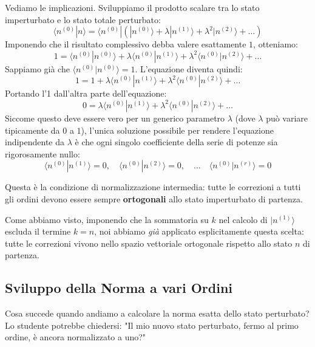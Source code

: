 Vediamo le implicazioni. Sviluppiamo il prodotto scalare tra lo stato imperturbato e lo stato totale perturbato:
\begin{equation}
\langle n^{(0)} | n \rangle = \langle n^{(0)} | \left( |n^{(0)}\rangle + \lambda |n^{(1)}\rangle + \lambda^2 |n^{(2)}\rangle + \dots \right)
\end{equation}
Imponendo che il risultato complessivo debba valere esattamente $1$, otteniamo:
\begin{equation}
1 = \langle n^{(0)} | n^{(0)} \rangle + \lambda \langle n^{(0)} | n^{(1)} \rangle + \lambda^2 \langle n^{(0)} | n^{(2)}\rangle + \dots
\end{equation}
Sappiamo già che $\langle n^{(0)} \vert{} n^{(0)} \rangle = 1$. L'equazione diventa quindi:
\begin{equation}
1 = 1 + \lambda \langle n^{(0)} | n^{(1)} \rangle + \lambda^2 \langle n^{(0)} | n^{(2)}\rangle + \dots
\end{equation}
Portando l'1 dall'altra parte dell'equazione:
\begin{equation}
0 = \lambda \langle n^{(0)} | n^{(1)} \rangle + \lambda^2 \langle n^{(0)} | n^{(2)}\rangle + \dots
\end{equation}
Siccome questo deve essere vero per un generico parametro $\lambda$ (dove $\lambda$ può variare tipicamente da $0$ a $1$), l'unica soluzione possibile per rendere l'equazione indipendente da $\lambda$ è che ogni singolo coefficiente della serie di potenze sia rigorosamente nullo:
\begin{equation}
\langle n^{(0)} | n^{(1)} \rangle = 0, \quad \langle n^{(0)} | n^{(2)} \rangle = 0, \quad \dots \quad \langle n^{(0)} | n^{(r)} \rangle = 0
\end{equation}

Questa è la condizione di normalizzazione intermedia: tutte le correzioni a tutti gli ordini devono essere sempre \textbf{ortogonali} allo stato imperturbato di partenza.

Come abbiamo visto, imponendo che la sommatoria su $k$ nel calcolo di $\vert{}n^{(1)}\rangle$ escluda il termine $k=n$, noi abbiamo \textit{già} applicato esplicitamente questa scelta: tutte le correzioni vivono nello spazio vettoriale ortogonale rispetto allo stato $n$ di partenza.

\subsection{Sviluppo della Norma a vari Ordini}
Cosa succede quando andiamo a calcolare la norma esatta dello stato perturbato? Lo studente potrebbe chiedersi: "Il mio nuovo stato perturbato, fermo al primo ordine, è ancora normalizzato a uno?"

